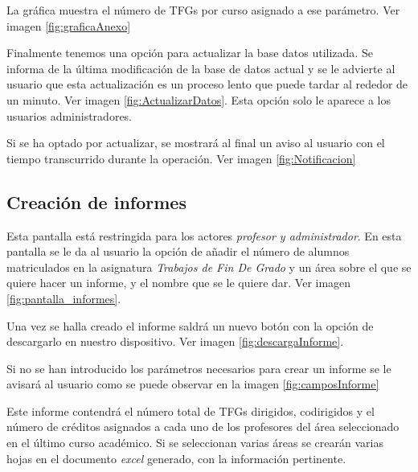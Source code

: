 La gráfica muestra el número de TFGs por curso asignado a ese parámetro. Ver imagen \ref{fig:graficaAnexo}


Finalmente tenemos una opción para actualizar la base datos utilizada. Se informa de la última modificación de la base de datos actual y se le advierte al usuario que esta actualización es un proceso lento que puede tardar al rededor de un minuto. Ver imagen \ref{fig:ActualizarDatos}. Esta opción solo le aparece a los usuarios administradores.


Si se ha optado por actualizar, se mostrará al final un aviso al usuario con el tiempo transcurrido durante la operación. Ver imagen \ref{fig:Notificacion}

\subsection{Creación de informes}
Esta pantalla está restringida para los actores \emph{profesor y administrador}.
En esta pantalla se le da al usuario la opción de añadir el número de alumnos matriculados en la asignatura \emph{Trabajos de Fin De Grado} y un área sobre el que se quiere hacer un informe, y el nombre que se le quiere dar. 
Ver imagen \ref{fig:pantalla_informes}.


Una vez se halla creado el informe saldrá un nuevo botón con la opción de descargarlo en nuestro dispositivo. Ver imagen \ref{fig:descargaInforme}.


Si no se han introducido los parámetros necesarios para crear un informe se le avisará al usuario como se puede observar en la imagen \ref{fig:camposInforme}


Este informe contendrá el número total de TFGs dirigidos, codirigidos y el número de créditos asignados a cada uno de los profesores del área seleccionado en el último curso académico. Si se seleccionan varias áreas se crearán varias hojas en el documento \emph{excel} generado, con la información pertinente. 

